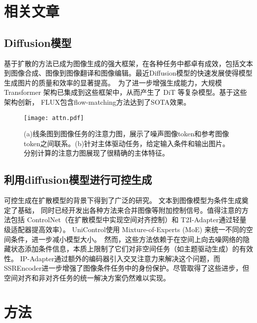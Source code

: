 \section{相关文章}
\subsection{Diffusion模型}
基于扩散的方法已成为图像生成的强大框架\cite{ho2020denoising,rombach2021highresolution}，在各种任务中都卓有成效，包括文本到图像合成、图像到图像翻译和图像编辑。最近Diffusion模型的快速发展使得模型生成图片的质量和效率的显著提高。\
为了进一步增强生成能力，大规模 Transformer 架构已集成到这些框架中，从而产生了 DiT 等复杂模型。基于这些架构创新， FLUX包含flow-matching方法达到了SOTA效果。
\begin{figure}[htbp]
    \centering
    \texttt{[image: attn.pdf]}
    \caption{(a)线条图到图像任务的注意力图，展示了噪声图像token和参考图像token之间联系。(b)针对主体驱动任务，给定输入条件和输出图片。分别计算的注意力图展现了很精确的主体特征。}
    \label{fig2}
\end{figure}
\subsection{利用diffusion模型进行可控生成}
可控生成在扩散模型的背景下得到了广泛的研究。 文本到图像模型为条件生成奠定了基础， 同时已经开发出各种方法来合并图像等附加控制信号。值得注意的方法包括 ControlNet\cite{zavadski2023controlnet}（在扩散模型中实现空间对齐控制）和 T2I-Adapter\cite{mou2024t2i}通过轻量级适配器提高效率）。 UniControl\cite{zhao2024uni}使用 Mixture-of-Experts (MoE) 来统一不同的空间条件，进一步减小模型大小。\
然而，这些方法依赖于在空间上向去噪网络的隐藏状态添加条件信息，本质上限制了它们对非空间任务（如主题驱动生成）的有效性。 IP-Adapter\cite{ye2023ip}通过额外的编码器引入交叉注意力来解决这个问题，而SSREncoder\cite{zhang2024ssr}进一步增强了图像条件任务中的身份保护。尽管取得了这些进步，但空间对齐和非对齐任务的统一解决方案仍然难以实现。
\section{方法}
